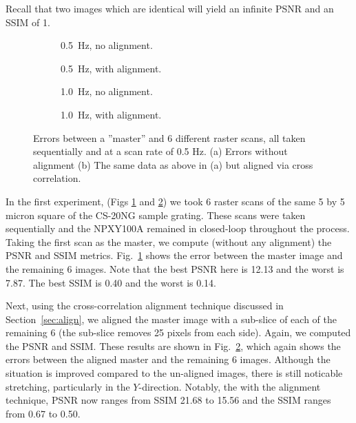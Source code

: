 Recall that two images which are identical will yield an infinite PSNR and an SSIM of 1.

\begin{figure}[t!]
  \begin{subfigure}{.48\textwidth}
    
    \caption{0.5~Hz, no alignment.}
    \label{fig:rast_unaligned_0p5}
  \end{subfigure}
  \hfill
  \begin{subfigure}{.48\textwidth}
    
      \caption{0.5~Hz, with alignment.}
    \label{fig:rast_aligned_0p5}
  \end{subfigure}
    \begin{subfigure}{.48\textwidth}
    
    \caption{1.0~Hz, no alignment.}
    \label{fig:rast_unaligned_1}
  \end{subfigure}
  \hfill
  \begin{subfigure}{.48\textwidth}
    
      \caption{1.0~Hz, with alignment.}
    \label{fig:rast_aligned_1}
  \end{subfigure}
% 
  \caption{Errors between a ''master'' and 6 different raster scans, all taken sequentially and at a scan rate of 0.5 Hz. (a) Errors without alignment (b) The same data as above in (a) but aligned via cross correlation.}
  \label{fig:baseline_errors}
\end{figure}

In the first experiment, (Figs \ref{fig:rast_unaligned_0p5} and \ref{fig:rast_aligned_0p5})
we took 6 raster scans of the same 5 by 5 micron square of the CS-20NG sample grating.
These scans were taken sequentially and the NPXY100A remained in closed-loop throughout the process.
Taking the first scan as the master, we compute (without any alignment) the PSNR and SSIM metrics.
Fig.~\ref{fig:rast_unaligned_0p5} shows the error between the master image and the remaining 6 images.
Note that the best PSNR here is 12.13 and the worst is 7.87. The best SSIM is 0.40 and the worst is 0.14.

Next, using the cross-correlation alignment technique discussed in Section~\ref{sec:align},
we aligned the master image with a sub-slice of each of the remaining 6 (the sub-slice removes 25 pixels from each side). Again, we computed the PSNR and SSIM. These results are shown in Fig.~\ref{fig:rast_aligned_0p5}, which again shows the errors between the aligned master and the remaining 6 images. 
Although the situation is improved compared to the un-aligned images, there is still noticable stretching, particularly in the $Y$-direction. Notably, the with the alignment technique, PSNR now ranges from SSIM 21.68 to 15.56 and the SSIM ranges from 0.67 to 0.50. 


